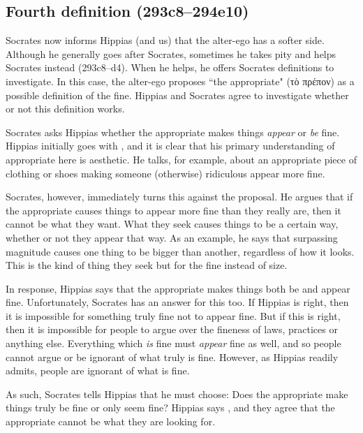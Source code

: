 \documentclass[11pt]{article}
\begin{document}

\subsection{Fourth definition (293c8--294e10)}

Socrates now informs Hippias (and us) that the alter-ego has a softer side.  Although he generally goes after Socrates, sometimes he takes pity and helps Socrates instead (293c8--d4).  When he helps, he offers Socrates definitions to investigate.  In this case, the alter-ego proposes ``the appropriate" (τὸ πρέπον) as a possible definition of the fine. Hippias and Socrates agree to investigate whether or not this definition works.

Socrates asks Hippias whether the appropriate makes things \emph{appear} or \emph{be} fine.  Hippias initially goes with , and it is clear that his primary understanding of appropriate here is aesthetic.  He talks, for example, about an appropriate piece of clothing or shoes making someone (otherwise) ridiculous appear more fine.

Socrates, however, immediately turns this against the proposal.  He argues that if the appropriate causes things to appear more fine than they really are, then it cannot be what they want.  What they seek causes things to be a certain way, whether or not they appear that way.  As an example, he says that surpassing magnitude causes one thing to be bigger than another, regardless of how it looks.  This is the kind of thing they seek but for the fine instead of size.

In response, Hippias says that the appropriate makes things both be and appear fine.  Unfortunately, Socrates has an answer for this too.  If Hippias is right, then it is impossible for something truly fine not to appear fine.  But if this is right, then it is impossible for people to argue over the fineness of laws, practices or anything else.  Everything which \emph{is} fine must \emph{appear} fine as well, and so people cannot argue or be ignorant of what truly is fine.  However, as Hippias readily admits, people are ignorant of what is fine.

As such, Socrates tells Hippias that he must choose: Does the appropriate make things truly be fine or only seem fine?  Hippias says , and they agree that the appropriate cannot be what they are looking for.

\end{document}
